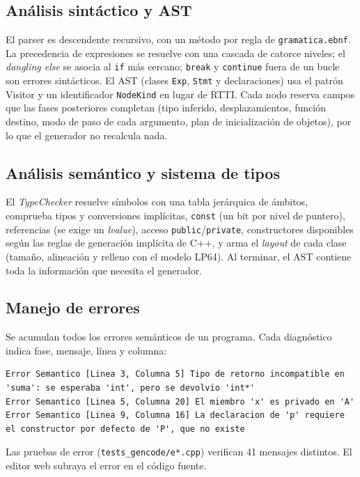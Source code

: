 \documentclass[11pt,a4paper]{article}
\newcommand{\cod}[1]{\texttt{#1}}
\begin{document}
\subsection{Análisis sintáctico y AST}
El parser es descendente recursivo, con un método por regla de \cod{gramatica.ebnf}. La precedencia de
expresiones se resuelve con una cascada de catorce niveles; el \emph{dangling else} se asocia al \cod{if} más
cercano; \cod{break} y \cod{continue} fuera de un bucle son errores sintácticos. El AST (clases \cod{Exp}, \cod{Stmt}
y declaraciones) usa el patrón Visitor y un identificador \cod{NodeKind} en lugar de RTTI. Cada nodo reserva
campos que las fases posteriores completan (tipo inferido, desplazamientos, función destino, modo de paso de cada
argumento, plan de inicialización de objetos), por lo que el generador no recalcula nada.

\subsection{Análisis semántico y sistema de tipos}
El \emph{TypeChecker} resuelve símbolos con una tabla jerárquica de ámbitos, comprueba tipos y conversiones
implícitas, \cod{const} (un bit por nivel de puntero), referencias (se exige un \emph{lvalue}), acceso
\cod{public}/\cod{private}, constructores disponibles según las reglas de generación implícita de C++, y arma el
\emph{layout} de cada clase (tamaño, alineación y relleno con el modelo LP64). Al terminar, el AST contiene toda
la información que necesita el generador.

\subsection{Manejo de errores}
Se acumulan todos los errores semánticos de un programa. Cada diagnóstico indica fase, mensaje, línea y columna:
\begin{lstlisting}
Error Semantico [Linea 3, Columna 5] Tipo de retorno incompatible en 'suma': se esperaba 'int', pero se devolvio 'int*'
Error Semantico [Linea 5, Columna 20] El miembro 'x' es privado en 'A'
Error Semantico [Linea 9, Columna 16] La declaracion de 'p' requiere el constructor por defecto de 'P', que no existe
\end{lstlisting}
Las pruebas de error (\cod{tests\_gencode/e*.cpp}) verifican 41 mensajes distintos. El editor web subraya el
error en el código fuente.

\end{document}
